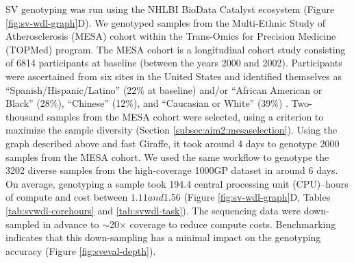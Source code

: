 \documentclass[11pt]{ucscthesis}
\begin{document}
SV genotyping was run using the NHLBI BioData Catalyst ecosystem \cite{bdc2020} (Figure \ref{fig:sv-wdl-graph}D).
We genotyped samples from the Multi-Ethnic Study of Atherosclerosis (MESA) cohort within the Trans-Omics for Precision Medicine (TOPMed) program.
The MESA cohort is a longitudinal cohort study consisting of 6814 participants at baseline (between the years 2000 and 2002).
Participants were ascertained from six sites in the United States and identified themselves as “Spanish/Hispanic/Latino” (22$\%$ at baseline) and/or “African American or Black” (28$\%$), “Chinese” (12$\%$), and “Caucasian or White” (39$\%$) \cite{mesa_2008}. Two-thousand samples from the MESA cohort \cite{mesa_2008} were selected, using a criterion to maximize the sample diversity (Section \ref{subsec:aim2:mesaselection}).
Using the graph described above and fast Giraffe, it took around 4 days to genotype 2000 samples from the MESA cohort.
We used the same workflow to genotype the 3202 diverse samples from the high-coverage 1000GP dataset \cite{1000gp_nygc_2021} in around 6 days.
On average, genotyping a sample took 194.4 central processing unit (CPU)–hours of compute and cost between $1.11 and $1.56 (Figure \ref{fig:sv-wdl-graph}D, Tables \ref{tab:svwdl-corehours} and \ref{tab:svwdl-task}).
The sequencing data were down-sampled in advance to $\sim$20× coverage to reduce compute costs.
Benchmarking indicates that this down-sampling has a minimal impact on the genotyping accuracy (Figure \ref{fig:sveval-depth}).
\end{document}
